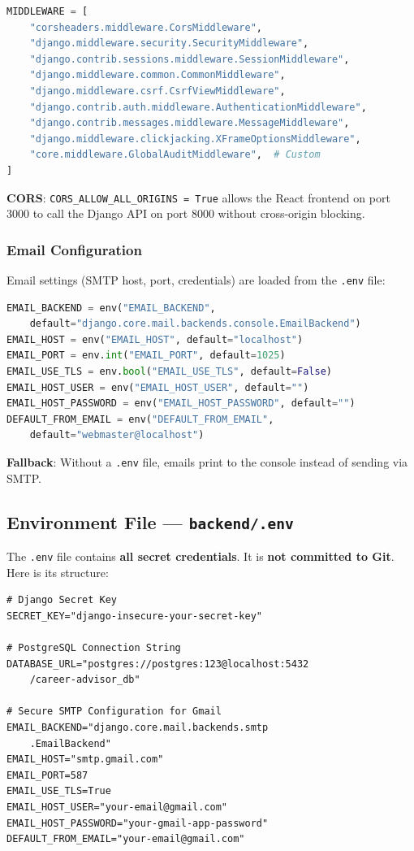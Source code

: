 \documentclass[12pt, a4paper]{article}
\begin{document}
\begin{lstlisting}[language=Python, caption={Middleware Stack (order matters)}]
MIDDLEWARE = [
    "corsheaders.middleware.CorsMiddleware",
    "django.middleware.security.SecurityMiddleware",
    "django.contrib.sessions.middleware.SessionMiddleware",
    "django.middleware.common.CommonMiddleware",
    "django.middleware.csrf.CsrfViewMiddleware",
    "django.contrib.auth.middleware.AuthenticationMiddleware",
    "django.contrib.messages.middleware.MessageMiddleware",
    "django.middleware.clickjacking.XFrameOptionsMiddleware",
    "core.middleware.GlobalAuditMiddleware",  # Custom
]
\end{lstlisting}

\textbf{CORS}: \texttt{CORS\_ALLOW\_ALL\_ORIGINS = True} allows the React frontend on port 3000 to call the Django API on port 8000 without cross-origin blocking.

\subsubsection{Email Configuration}

Email settings (SMTP host, port, credentials) are loaded from the \texttt{.env} file:

\begin{lstlisting}[language=Python, caption={Email Settings in base.py}]
EMAIL_BACKEND = env("EMAIL_BACKEND",
    default="django.core.mail.backends.console.EmailBackend")
EMAIL_HOST = env("EMAIL_HOST", default="localhost")
EMAIL_PORT = env.int("EMAIL_PORT", default=1025)
EMAIL_USE_TLS = env.bool("EMAIL_USE_TLS", default=False)
EMAIL_HOST_USER = env("EMAIL_HOST_USER", default="")
EMAIL_HOST_PASSWORD = env("EMAIL_HOST_PASSWORD", default="")
DEFAULT_FROM_EMAIL = env("DEFAULT_FROM_EMAIL",
    default="webmaster@localhost")
\end{lstlisting}

\textbf{Fallback}: Without a \texttt{.env} file, emails print to the console instead of sending via SMTP.

\subsection{Environment File --- \texttt{backend/.env}}

The \texttt{.env} file contains \textbf{all secret credentials}. It is \textbf{not committed to Git}. Here is its structure:

\begin{lstlisting}[caption={Complete .env File Template}]
# Django Secret Key
SECRET_KEY="django-insecure-your-secret-key"

# PostgreSQL Connection String
DATABASE_URL="postgres://postgres:123@localhost:5432
    /career-advisor_db"

# Secure SMTP Configuration for Gmail
EMAIL_BACKEND="django.core.mail.backends.smtp
    .EmailBackend"
EMAIL_HOST="smtp.gmail.com"
EMAIL_PORT=587
EMAIL_USE_TLS=True
EMAIL_HOST_USER="your-email@gmail.com"
EMAIL_HOST_PASSWORD="your-gmail-app-password"
DEFAULT_FROM_EMAIL="your-email@gmail.com"
\end{lstlisting}
\end{document}
